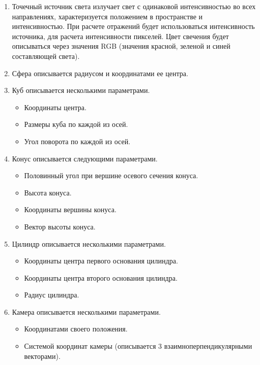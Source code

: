 \begin{enumerate}
	\item  Точечный источник света излучает свет с одинаковой интенсивностью во всех направлениях, характеризуется положением в пространстве и интенсивностью.
	При расчете отражений будет использоваться интенсивность источника, для расчета интенсивности пикселей. Цвет свечения будет описываться через значения RGB (значения красной, зеленой и синей составляющей света).
	
	
	
	\item Сфера описывается радиусом и координатами ее центра.
	
	\item  Куб описывается несколькими параметрами.
	\begin{itemize}
		\item Координаты центра.
		\item Размеры куба по каждой из осей.
		\item Угол поворота по каждой из осей.
	\end{itemize}
	
	\item Конус описывается следующими параметрами.
	\begin{itemize}
		\item Половинный угол при вершине осевого сечения конуса.
		\item Высота конуса.
		\item Координаты вершины конуса.
		\item Вектор высоты конуса.
	\end{itemize}
	
	\item Цилиндр описывается несколькими параметрами.
	\begin{itemize}
		\item Координаты центра первого основания цилиндра.
		\item Координаты центра второго основания цилиндра.
		\item Радиус цилиндра.
	\end{itemize}
	
	
	\item Камера описывается несколькими параметрами.
	\begin{itemize}
		\item Координатами своего положения.
		\item Системой координат камеры (описывается 3 взаимноперпендикулярными векторами).
	\end{itemize}
\end{enumerate}

